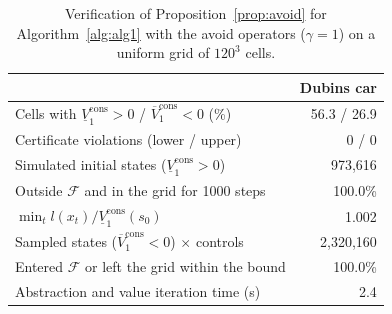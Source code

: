 \begin{table}[t]
\caption{Verification of Proposition~\ref{prop:avoid} for Algorithm~\ref{alg:alg1} with the avoid operators ($\gamma=1$) on a uniform grid of $120^3$ cells.}
\label{tab:avoid_verification}
\small
\begin{tabular}{lr}
\toprule
 & Dubins car \\
\midrule
Cells with $\underline V_1^{\mathrm{cons}}>0$ / $\overline V_1^{\mathrm{cons}}<0$ (\%) & 56.3 / 26.9 \\
Certificate violations (lower / upper) & 0 / 0 \\
Simulated initial states ($\underline V_1^{\mathrm{cons}}>0$) & 973{,}616 \\
Outside $\mathcal F$ and in the grid for 1000 steps & 100.0\% \\
$\min_t l(x_t)/\underline V_1^{\mathrm{cons}}(s_0)$ & 1.002 \\
Sampled states ($\overline V_1^{\mathrm{cons}}<0$) $\times$ controls & 2{,}320{,}160 \\
Entered $\mathcal F$ or left the grid within the bound & 100.0\% \\
Abstraction and value iteration time (s) & 2.4 \\
\bottomrule
\end{tabular}
\end{table}
